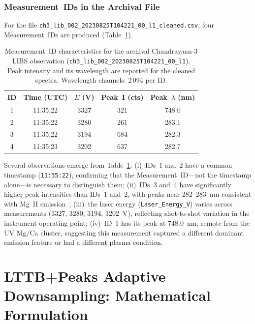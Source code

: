 \documentclass[a4paper,twocolumn,10pt]{article}
\begin{document}
\subsubsection{Measurement~IDs in the Archival File}

For the file \texttt{ch3\_lib\_002\_20230825T104221\_00\_l1\_cleaned.csv},
four Measurement~IDs are produced (Table~\ref{tab:measurement_ids}).

\begin{table}[!t]
\centering
\caption{Measurement~ID characteristics for the archival
  Chandrayaan-3 LIBS observation
  (\texttt{ch3\_lib\_002\_20230825T104221\_00\_l1}).
  Peak intensity and its wavelength are reported for the cleaned
  spectra.  Wavelength channels: 2\,094 per ID.}
\label{tab:measurement_ids}
\begin{tabularx}{\textwidth}{@{}ccccc@{}}
\toprule
\textbf{ID} & \textbf{Time (UTC)} & \textbf{$E$ (V)} & \textbf{Peak~I (cts)} & \textbf{Peak~$\lambda$ (nm)} \\
\midrule
1 & 11:35:22 & 3327 & 321  & 748.0 \\
2 & 11:35:22 & 3280 & 261  & 283.1 \\
3 & 11:35:22 & 3194 & 684  & 282.3 \\
4 & 11:35:23 & 3202 & 637  & 282.7 \\
\bottomrule
\end{tabularx}
\end{table}

Several observations emerge from Table~\ref{tab:measurement_ids}:
(i)~IDs~1 and~2 have a common timestamp (\texttt{11:35:22}),
confirming that the Measurement~ID---not the timestamp alone---is
necessary to distinguish them; (ii)~IDs~3 and~4 have significantly
higher peak intensities than IDs~1 and~2, with peaks near 282--283~nm
consistent with Mg~II emission~\cite{NIST}; (iii)~the laser energy
(\texttt{Laser\_Energy\_V}) varies across measurements (3327, 3280,
3194, 3202~V), reflecting shot-to-shot variation in the instrument
operating point; (iv)~ID~1 has its peak at 748.0~nm, remote from the
UV Mg/Ca cluster, suggesting this measurement captured a different
dominant emission feature or had a different plasma condition.


\section{LTTB+Peaks Adaptive Downsampling: Mathematical Formulation}
\label{sec:math}
\end{document}
